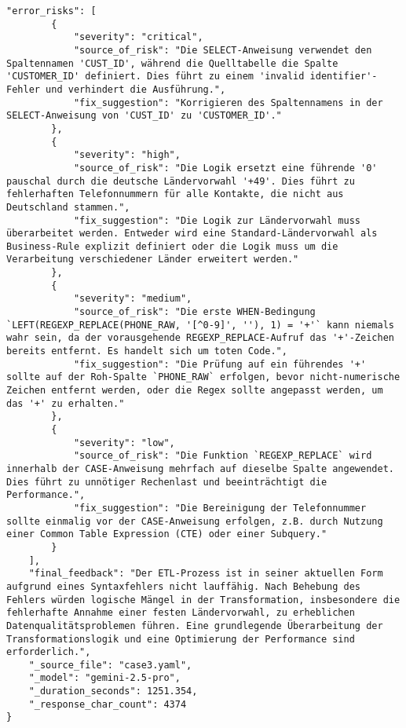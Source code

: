 \begin{lstlisting}[caption={Ausgabe: Gemini 2.5 Pro Anwendungsfall 3 Hauptdurchlauf},label={gemini_case3_prompt1}]
    "error_risks": [
        {
            "severity": "critical",
            "source_of_risk": "Die SELECT-Anweisung verwendet den Spaltennamen 'CUST_ID', während die Quelltabelle die Spalte 'CUSTOMER_ID' definiert. Dies führt zu einem 'invalid identifier'-Fehler und verhindert die Ausführung.",
            "fix_suggestion": "Korrigieren des Spaltennamens in der SELECT-Anweisung von 'CUST_ID' zu 'CUSTOMER_ID'."
        },
        {
            "severity": "high",
            "source_of_risk": "Die Logik ersetzt eine führende '0' pauschal durch die deutsche Ländervorwahl '+49'. Dies führt zu fehlerhaften Telefonnummern für alle Kontakte, die nicht aus Deutschland stammen.",
            "fix_suggestion": "Die Logik zur Ländervorwahl muss überarbeitet werden. Entweder wird eine Standard-Ländervorwahl als Business-Rule explizit definiert oder die Logik muss um die Verarbeitung verschiedener Länder erweitert werden."
        },
        {
            "severity": "medium",
            "source_of_risk": "Die erste WHEN-Bedingung `LEFT(REGEXP_REPLACE(PHONE_RAW, '[^0-9]', ''), 1) = '+'` kann niemals wahr sein, da der vorausgehende REGEXP_REPLACE-Aufruf das '+'-Zeichen bereits entfernt. Es handelt sich um toten Code.",
            "fix_suggestion": "Die Prüfung auf ein führendes '+' sollte auf der Roh-Spalte `PHONE_RAW` erfolgen, bevor nicht-numerische Zeichen entfernt werden, oder die Regex sollte angepasst werden, um das '+' zu erhalten."
        },
        {
            "severity": "low",
            "source_of_risk": "Die Funktion `REGEXP_REPLACE` wird innerhalb der CASE-Anweisung mehrfach auf dieselbe Spalte angewendet. Dies führt zu unnötiger Rechenlast und beeinträchtigt die Performance.",
            "fix_suggestion": "Die Bereinigung der Telefonnummer sollte einmalig vor der CASE-Anweisung erfolgen, z.B. durch Nutzung einer Common Table Expression (CTE) oder einer Subquery."
        }
    ],
    "final_feedback": "Der ETL-Prozess ist in seiner aktuellen Form aufgrund eines Syntaxfehlers nicht lauffähig. Nach Behebung des Fehlers würden logische Mängel in der Transformation, insbesondere die fehlerhafte Annahme einer festen Ländervorwahl, zu erheblichen Datenqualitätsproblemen führen. Eine grundlegende Überarbeitung der Transformationslogik und eine Optimierung der Performance sind erforderlich.",
    "_source_file": "case3.yaml",
    "_model": "gemini-2.5-pro",
    "_duration_seconds": 1251.354,
    "_response_char_count": 4374
}
\end{lstlisting}

